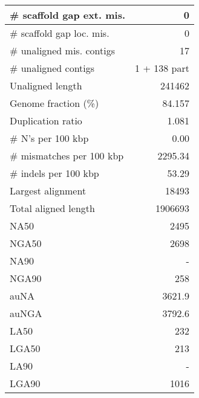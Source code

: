 \documentclass[12pt,a4paper]{article}
\begin{document}
\begin{table}[ht]
\begin{center}
\begin{tabular}{|l*{1}{|r}|}
\# scaffold gap ext. mis. & 0 \\ \hline
\# scaffold gap loc. mis. & 0 \\ \hline
\# unaligned mis. contigs & 17 \\ \hline
\# unaligned contigs & 1 + 138 part \\ \hline
Unaligned length & 241462 \\ \hline
Genome fraction (\%) & 84.157 \\ \hline
Duplication ratio & 1.081 \\ \hline
\# N's per 100 kbp & 0.00 \\ \hline
\# mismatches per 100 kbp & 2295.34 \\ \hline
\# indels per 100 kbp & 53.29 \\ \hline
Largest alignment & 18493 \\ \hline
Total aligned length & 1906693 \\ \hline
NA50 & 2495 \\ \hline
NGA50 & 2698 \\ \hline
NA90 & - \\ \hline
NGA90 & 258 \\ \hline
auNA & 3621.9 \\ \hline
auNGA & 3792.6 \\ \hline
LA50 & 232 \\ \hline
LGA50 & 213 \\ \hline
LA90 & - \\ \hline
LGA90 & 1016 \\ \hline
\end{tabular}
\end{center}
\end{table}
\end{document}

